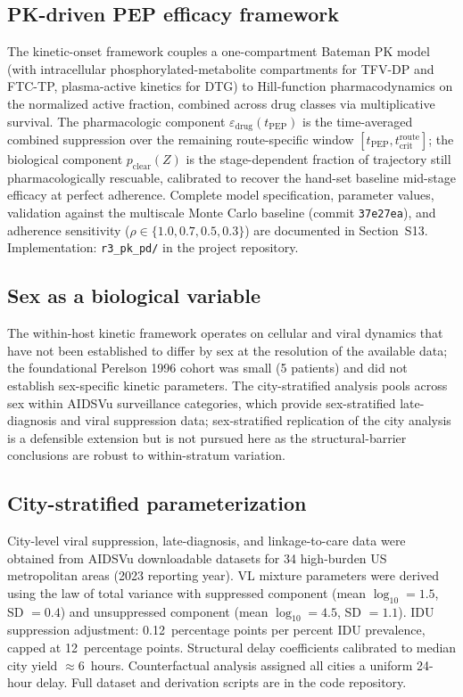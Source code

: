 \documentclass[10pt,letterpaper]{article}
\theoremstyle{definition}
\theoremstyle{remark}
\newcommand{\tcrit}{t_{\text{crit}}}
\begin{document}
\subsection*{PK-driven PEP efficacy framework}
The kinetic-onset framework couples a one-compartment Bateman PK model (with intracellular phosphorylated-metabolite compartments for TFV-DP and FTC-TP, plasma-active kinetics for DTG) to Hill-function pharmacodynamics on the normalized active fraction, combined across drug classes via multiplicative survival. The pharmacologic component $\varepsilon_{\text{drug}}(t_{\text{PEP}})$ is the time-averaged combined suppression over the remaining route-specific window $[t_{\text{PEP}}, \tcrit^{\text{route}}]$; the biological component $p_{\text{clear}}(Z)$ is the stage-dependent fraction of trajectory still pharmacologically rescuable, calibrated to recover the hand-set baseline mid-stage efficacy at perfect adherence. Complete model specification, parameter values, validation against the multiscale Monte Carlo baseline (commit \texttt{37e27ea}), and adherence sensitivity ($\rho \in \{1.0, 0.7, 0.5, 0.3\}$) are documented in Section~S13. Implementation: \texttt{r3\_pk\_pd/} in the project repository.

\subsection*{Sex as a biological variable}
The within-host kinetic framework operates on cellular and viral dynamics that have not been established to differ by sex at the resolution of the available data; the foundational Perelson 1996 cohort\cite{perelson1996} was small (5 patients) and did not establish sex-specific kinetic parameters. The city-stratified analysis pools across sex within AIDSVu surveillance categories, which provide sex-stratified late-diagnosis and viral suppression data; sex-stratified replication of the city analysis is a defensible extension but is not pursued here as the structural-barrier conclusions are robust to within-stratum variation.

\subsection*{City-stratified parameterization}
City-level viral suppression, late-diagnosis, and linkage-to-care data were obtained from AIDSVu downloadable datasets for 34 high-burden US metropolitan areas (2023 reporting year). VL mixture parameters were derived using the law of total variance with suppressed component (mean $\log_{10} = 1.5$, SD $= 0.4$) and unsuppressed component (mean $\log_{10} = 4.5$, SD $= 1.1$). IDU suppression adjustment: 0.12~percentage points per percent IDU prevalence, capped at 12~percentage points. Structural delay coefficients calibrated to median city yield $\approx$6~hours. Counterfactual analysis assigned all cities a uniform 24-hour delay. Full dataset and derivation scripts are in the code repository.
\end{document}
